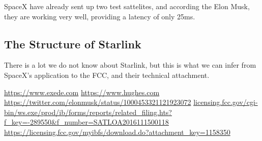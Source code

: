 \documentclass[12pt]{article}
\begin{document}

SpaceX have already sent up two test sattelites, and according the Elon Musk, they are working very well, providing a latency of only 25ms\cite{ElonMuskTweet}.


\subsection{The Structure of Starlink}

There is a lot we do not know about Starlink, but this is what we can infer from SpaceX’s application to the FCC\cite{FCCApplication}, and their technical attachment\cite{TechnicalAttachment}.




\begin{thebibliography}{9}
 \url{https://www.exede.com}
 \url{https://www.hughes.com}
 \url{https://twitter.com/elonmusk/status/1000453321121923072}
 \url{licensing.fcc.gov/cgi-bin/ws.exe/prod/ib/forms/reports/related_filing.hts?f_key=-289550&f_number=SATLOA2016111500118}
 \url{https://licensing.fcc.gov/myibfs/download.do?attachment_key=1158350}
\end{thebibliography}
\end{document}
